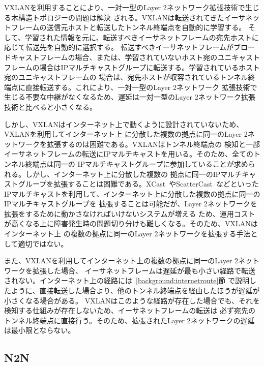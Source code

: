VXLANを利用することにより、一対一型のLayer 2ネットワーク拡張技術で生じる木構造トポロジーの問題は解決
される。VXLANは転送されてきたイーサネットフレームの送信元ホストと転送したトンネル終端点を自動的に学習する。
そして、学習された情報を元に、転送すべきイーサネットフレームの宛先ホストに応じて転送先を自動的に選択する。
転送すべきイーサネットフレームがブロードキャストフレームの場合、または、学習されていないホスト宛のユニキャスト
フレームの場合はIPマルチキャストグループに転送する。学習されているホスト宛のユニキャストフレームの
場合は、宛先ホストが収容されているトンネル終端点に直接転送する。これにより、一対一型のLayer 2ネットワーク
拡張技術で生じる不要な中継がなくなるため、遅延は一対一型のLayer 2ネットワーク拡張技術と比べると小さくなる。

しかし、VXLANはインターネット上で動くように設計されていないため、VXLANを利用してインターネット上
に分散した複数の拠点に同一のLayer 2ネットワークを拡張するのは困難である。VXLANはトンネル終端点の
検知と一部イーサネットフレームの転送にIPマルチキャストを用いる。そのため、全てのトンネル終端点は同一の
IPマルチキャストグループに参加していることが求められる。しかし、インターネット上に分散した複数の
拠点に同一のIPマルチキャストグループを拡張することは困難である。XCast~\cite{rfc:xcast}やScatterCast~\cite{scattercast}などといった
IPマルチキャストを利用して、インターネット上に分散した複数の拠点に同一のIPマルチキャストグループを
拡張することは可能だが、Layer 2ネットワークを拡張をするために動かさなければいけないシステムが増える
ため、運用コストが高くなる上に障害発生時の問題切り分けも難しくなる。そのため、VXLANはインターネット上
の複数の拠点に同一のLayer 2ネットワークを拡張する手法として適切ではない。

また、VXLANを利用してインターネット上の複数の拠点に同一のLayer 2ネットワークを拡張した場合、
イーサネットフレームは遅延が最も小さい経路で転送されない。インターネット上の経路には~\ref{background:internetroute}節
で説明したように、直接転送した場合より、他のトンネル終端点を経由したほうが遅延が小さくなる場合がある。
VXLANはこのような経路が存在した場合でも、それを検知する仕組みが存在しないため、イーサネットフレームの転送は
必ず宛先のトンネル終端点に直接行う。そのため、拡張されたLayer 2ネットワークの遅延は最小限とならない。

\subsection{N2N}
\label{rw:n2n}

